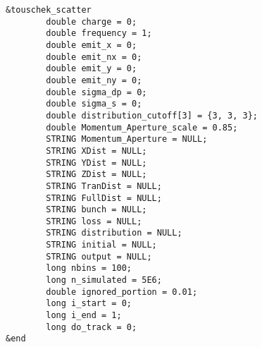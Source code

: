 \documentclass[11pt]{article}
\begin{document}
\begin{verbatim}
&touschek_scatter
        double charge = 0;
        double frequency = 1;
        double emit_x = 0;
        double emit_nx = 0;
        double emit_y = 0;
        double emit_ny = 0;
        double sigma_dp = 0;
        double sigma_s = 0;
        double distribution_cutoff[3] = {3, 3, 3};
        double Momentum_Aperture_scale = 0.85;
        STRING Momentum_Aperture = NULL;
        STRING XDist = NULL;
        STRING YDist = NULL;
        STRING ZDist = NULL;
        STRING TranDist = NULL;
        STRING FullDist = NULL;
        STRING bunch = NULL;
        STRING loss = NULL;
        STRING distribution = NULL;
        STRING initial = NULL;
        STRING output = NULL;
        long nbins = 100;
        long n_simulated = 5E6;
        double ignored_portion = 0.01;
        long i_start = 0;
        long i_end = 1;
        long do_track = 0;
&end
\end{verbatim}
\end{document}
